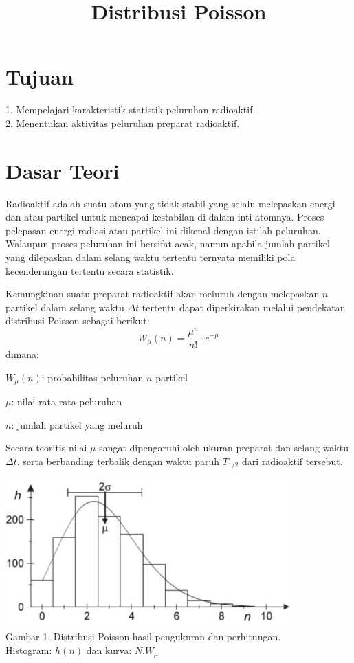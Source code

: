 \documentclass{article}
\title{Distribusi Poisson}
\date{}
\author{}
\begin{document}
	\maketitle
	
	\section{Tujuan}
		1. Mempelajari karakteristik statistik peluruhan radioaktif.\\
		2. Menentukan aktivitas peluruhan preparat radioaktif.
	
	\section{Dasar Teori}
	 
		\hspace{0.35 cm} Radioaktif adalah suatu atom yang tidak stabil yang selalu melepaskan energi dan atau partikel untuk mencapai kestabilan di dalam inti atomnya\cite{modul}. Proses pelepasan energi radiasi atau partikel ini dikenal dengan istilah peluruhan. Walaupun proses peluruhan ini bersifat acak, namun apabila jumlah partikel yang dilepaskan dalam selang waktu tertentu ternyata memiliki pola kecenderungan tertentu secara statistik.\par
		Kemungkinan suatu preparat radioaktif akan meluruh dengan melepaskan $n$ partikel dalam selang waktu $\Delta t$ tertentu dapat diperkirakan melalui pendekatan distribusi Poisson 
		sebagai berikut: 
		\begin{equation}
		W_{\mu}(n) = \frac{\mu^n}{n!}\cdot e^{-\mu}
		\end{equation}
		dimana:
		\par $W_{\mu}(n)$: probabilitas peluruhan $n$ partikel
		\par $\mu$: nilai rata-rata peluruhan
		\par $n$: jumlah partikel yang meluruh \\
		
		\par Secara teoritis nilai $\mu$ sangat dipengaruhi oleh ukuran preparat dan selang waktu $\Delta t$, serta berbanding terbalik dengan waktu paruh $T_{1/2}$ dari radioaktif tersebut\cite{modul}. 
	
		
		
		\begin{center}
			\includegraphics[width=110mm]{Picture/1.jpg}\\
			Gambar 1. Distribusi Poisson hasil pengukuran dan perhitungan. \\ Histogram: $h(n)$ dan kurva: $N.W_{\mu}$
		\end{center}
		
\end{document}
